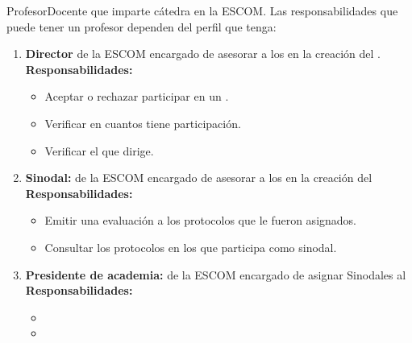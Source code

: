 \begin{actor}{Profesor}{Docente que imparte cátedra en la ESCOM. Las responsabilidades que puede tener un profesor dependen del perfil que tenga:} 
	
	\begin{enumerate}
		\item \textbf{Director}{ de la ESCOM encargado de asesorar a los  en la creación del .}\\
		\textbf{Responsabilidades:} \hspace{1pt}
		\begin{itemize}
			\item Aceptar o rechazar participar en un .
			\item Verificar en cuantos  tiene participación.
			\item Verificar el  que dirige.\\
		\end{itemize}
		
		
		\item \textbf{Sinodal:} { de la ESCOM encargado de asesorar a los  en la creación del }\\
		\textbf{Responsabilidades:} \hspace{1pt}
		\begin{itemize}
			\item Emitir una evaluación a los protocolos que le fueron asignados.
			\item Consultar los protocolos en los que participa como sinodal.
		\end{itemize}
	
		\item \textbf{Presidente de academia:} { de la ESCOM encargado de asignar Sinodales al }\\
		\textbf{Responsabilidades:} \hspace{1pt}
		\begin{itemize}
			\item 
			\item 
		\end{itemize}
	\end{enumerate}
\end{actor}

